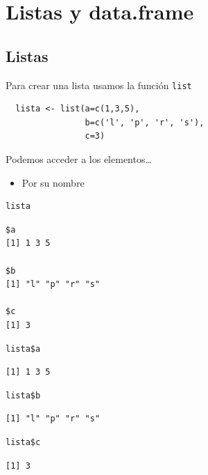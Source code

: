 \documentclass[xcolor={usenames,svgnames,dvipsnames}]{beamer}
\begin{document}
\section{Listas y data.frame}
\label{sec-3}

\subsection{Listas}
\label{sec-3-1}
\begin{frame}[fragile,label=sec-3-1-1]{Para crear una lista usamos la función \texttt{list}}
 \lstset{language=R,label= ,caption= ,numbers=none}
\begin{lstlisting}
  lista <- list(a=c(1,3,5),
                b=c('l', 'p', 'r', 's'),
                c=3)
\end{lstlisting}
\end{frame}

\begin{frame}[fragile,label=sec-3-1-2]{Podemos acceder a los elementos\ldots{}}
 \begin{itemize}
\item Por su nombre
\end{itemize}
\lstset{language=R,label= ,caption= ,numbers=none}
\begin{lstlisting}
lista
\end{lstlisting}

\begin{verbatim}
$a
[1] 1 3 5

$b
[1] "l" "p" "r" "s"

$c
[1] 3
\end{verbatim}

\lstset{language=R,label= ,caption= ,numbers=none}
\begin{lstlisting}
lista$a
\end{lstlisting}

\begin{verbatim}
[1] 1 3 5
\end{verbatim}

\lstset{language=R,label= ,caption= ,numbers=none}
\begin{lstlisting}
lista$b
\end{lstlisting}

\begin{verbatim}
[1] "l" "p" "r" "s"
\end{verbatim}

\lstset{language=R,label= ,caption= ,numbers=none}
\begin{lstlisting}
lista$c
\end{lstlisting}

\begin{verbatim}
[1] 3
\end{verbatim}
\end{frame}
\end{document}
